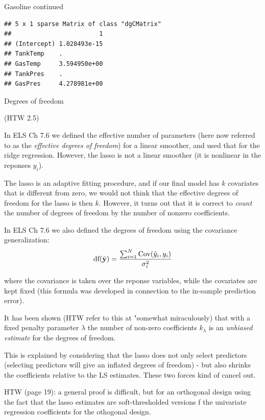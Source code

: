 \documentclass[
  ignorenonframetext,
]{beamer}
\begin{document}
\begin{frame}[fragile]
\begin{block}{Gasoline continued}
\begin{verbatim}
## 5 x 1 sparse Matrix of class "dgCMatrix"
##                        1
## (Intercept) 1.028493e-15
## TankTemp    .           
## GasTemp     3.594950e+00
## TankPres    .           
## GasPres     4.278981e+00
\end{verbatim}

\end{block}

\end{frame}

\begin{frame}

\begin{block}{Degrees of freedom}

(HTW 2.5)

In ELS Ch 7.6 we defined the effective number of parameters (here now
referred to as the \emph{effective degrees of freedom}) for a linear
smoother, and used that for the ridge regression. However, the lasso is
not a linear smoother (it is nonlinear in the reponses \(y_i\)).

The lasso is an adaptive fitting procedure, and if our final model has
\(k\) covariates that is different from zero, we would not think that
the effective degrees of freedom for the lasso is then \(k\). However,
it turns out that it is correct to \emph{count} the number of degrees of
freedom by the number of nonzero coefficients.

In ELS Ch 7.6 we also defined the degrees of freedom using the
covariance generalization:
\[\text{df}(\hat{{\bf y}})=\frac{\sum_{i=1}^N \text{Cov}(\hat{y}_i,y_i)}{\sigma_{\varepsilon}^2}\]

where the covariance is taken over the reponse variables, while the
covariates are kept fixed (this formula was developed in connection to
the in-sample prediction error).

\end{block}

\end{frame}

\begin{frame}

It has been shown (HTW refer to this at "somewhat miraculously) that
with a fixed penalty parameter \(\lambda\) the number of non-zero
coefficients \(k_{\lambda}\) is an \emph{unbiased estimate} for the
degrees of freedom.

This is explained by considering that the lasso does not only select
predictors (selecting predictors will give an inflated degrees of
freedom) - but also shrinks the coefficients relative to the LS
estimates. These two forces kind of cancel out.

HTW (page 19): a general proof is difficult, but for an orthogonal
design using the fact that the lasso estimates are soft-thresholded
versions f the univariate regression coefficients for the othogonal
design.

\end{frame}
\end{document}
